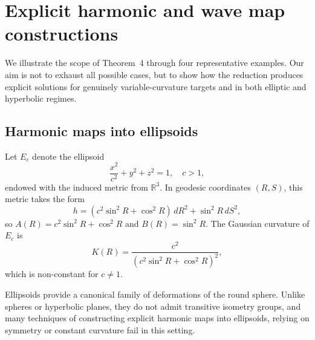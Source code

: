\documentclass[12pt]{amsart}
\begin{document}
\section{Explicit harmonic and wave map constructions}
\label{sec:examples}

We illustrate the scope of Theorem~4 through four representative examples. Our aim is not to exhaust all possible cases, but to show how the reduction produces explicit solutions for genuinely variable-curvature targets and in both elliptic and hyperbolic regimes. 

\subsection{Harmonic maps into ellipsoids}

Let $E_c$ denote the ellipsoid
\[
\frac{x^2}{c^2} + y^2 + z^2 = 1, \quad c > 1,
\]
endowed with the induced metric from $\mathbb{R}^3$. In geodesic
coordinates $(R,S)$, this metric takes the form
\[
h = (c^2\sin^2 R + \cos^2 R)\,dR^2 + \sin^2 R\,dS^2,
\]
so $A(R) = c^2\sin^2 R + \cos^2 R$ and $B(R) = \sin^2 R$.
The Gaussian curvature of $E_c$ is
\[
K(R) = \frac{c^2}{(c^2\sin^2 R + \cos^2 R)^2},
\]
which is non-constant for $c \neq 1$.

Ellipsoids provide a canonical family of deformations of the round
sphere. Unlike spheres or hyperbolic planes, they do not admit
transitive isometry groups, and many techniques of constructing explicit harmonic maps into ellipsoids, relying on symmetry
or constant curvature fail in this setting.
\end{document}
